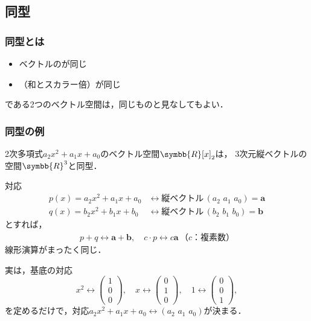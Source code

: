 \documentclass[
    10pt,
    ]{sotsu-beamer}
\begin{document}
\subsection{同型}


\begin{frame}
    \frametitle{同型とは}

    \begin{itemize}
        \item ベクトルのが同じ
        \item {}（和とスカラー倍）が同じ
    \end{itemize}
    である2つのベクトル空間は，同じものと見なしてもよい．
    
\end{frame}


\begin{frame}[allowframebreaks]
    \frametitle{同型の例}

    2次多項式$a_2 x^2 + a_1 x + a_0$のベクトル空間$\symbb{R}[x]_2$は，
    3次元縦ベクトルの空間$\symbb{R}^3$と同型．

    対応
    \begin{align*}
        p(x) = a_2 x^2 + a_1 x + a_0
        &\leftrightarrow \text{縦ベクトル} \, (a_2 \,\, a_1 \,\, a_0) = \symbf{a}
        \\
        q(x) = b_2 x^2 + b_1 x + b_0
        &\leftrightarrow \text{縦ベクトル} \, (b_2 \,\, b_1 \,\, b_0) = \symbf{b}
    \end{align*}
    とすれば，
    \begin{align*}
        p + q \leftrightarrow \symbf{a} + \symbf{b},
        \quad
        c \cdotp p \leftrightarrow c \symbf{a} \, \text{（$c$：複素数）}
    \end{align*}
    線形演算がまったく同じ．


    \framebreak

    実は，基底の対応
    \begin{equation*}
        x^2 \leftrightarrow \begin{pmatrix} 1 \\ 0 \\ 0 \end{pmatrix},
        \quad 
        x \leftrightarrow \begin{pmatrix} 0 \\ 1 \\ 0 \end{pmatrix},
        \quad 
        1 \leftrightarrow \begin{pmatrix} 0 \\ 0 \\ 1 \end{pmatrix},
    \end{equation*}
    を定めるだけで，対応$a_2 x^2 + a_1 x + a_0 \leftrightarrow (a_2 \,\, a_1 \,\, a_0)$が決まる．

\end{frame}
\end{document}
